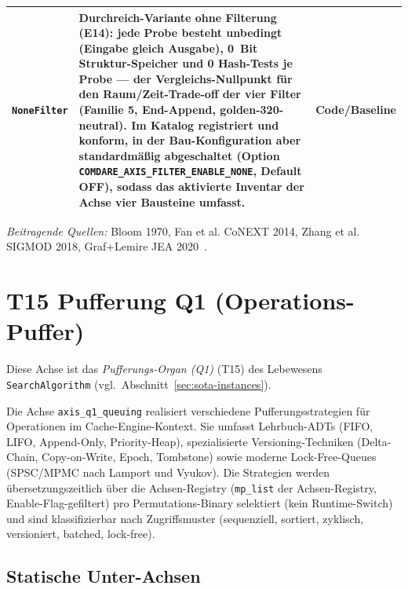 \begin{scriptsize}
\begin{longtable}{@{}>{\raggedright\arraybackslash}p{2.6cm} >{\raggedright\arraybackslash}p{7.4cm} >{\raggedright\arraybackslash}p{3.5cm}@{}}
\texttt{None\allowbreak{}Filter} & Durchreich-Variante ohne Filterung (E14): jede Probe besteht unbedingt (Eingabe gleich Ausgabe), 0~Bit Struktur-Speicher und 0 Hash-Tests je Probe --- der Vergleichs-Nullpunkt für den Raum/Zeit-Trade-off der vier Filter (Familie 5, End-Append, golden-320-neutral). Im Katalog registriert und konform, in der Bau-Konfiguration aber standardmäßig abgeschaltet (Option \texttt{COMDARE\_\allowbreak{}AXIS\_\allowbreak{}FILTER\_\allowbreak{}ENABLE\_\allowbreak{}NONE}, Default OFF), sodass das aktivierte Inventar der Achse vier Bausteine umfasst. & Code/\allowbreak{}Baseline \\
\bottomrule
\end{longtable}
\end{scriptsize}

\emph{Beitragende Quellen:} Bloom 1970, Fan et al. Co\allowbreak{}NEXT 2014, Zhang et al. SIGMOD 2018, Graf+Lemire JEA 2020~\cite{bloom1970,fan2014cuckoo,zhang2018surf,graf2020xor}.

\section{T15 Pufferung Q1 (Operations-Puffer)}

Diese Achse ist das \emph{Pufferungs-Organ (Q1)} (T15) des Lebewesens \texttt{SearchAlgorithm} (vgl.\ Abschnitt~\ref{sec:sota-instances}).

Die Achse \texttt{axis\_\allowbreak{}q1\_\allowbreak{}queuing} realisiert verschiedene Pufferungsstrategien für Operationen im Cache-Engine-Kontext. Sie umfasst Lehrbuch-ADTs (FIFO, LIFO, Append-Only, Priority-Heap), spezialisierte Versioning-Techniken (Delta-Chain, Copy-on-Write, Epoch, Tombstone) sowie moderne Lock-Free-Queues (SPSC/\allowbreak{}MPMC nach Lamport und Vyukov). Die Strategien werden übersetzungszeitlich über die Achsen-Registry (\texttt{mp\_list} der Achsen-Registry, Enable-Flag-gefiltert) pro Permutations-Binary selektiert (kein Runtime-Switch) und sind klassifizierbar nach Zugriffsmuster (sequenziell, sortiert, zyklisch, versioniert, batched, lock-free).

\subsection*{Statische Unter-Achsen}

